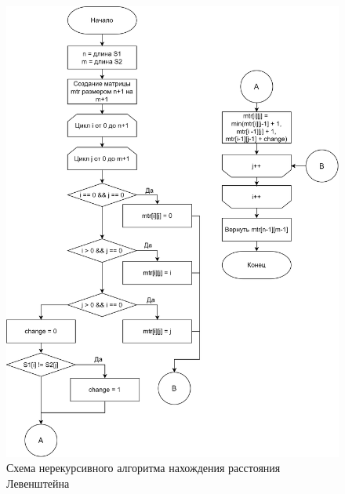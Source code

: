 \begin{figure}[h]
	\centering
	\includegraphics[height=0.8\textheight]{img/levmatr.png}
	\caption{Схема нерекурсивного алгоритма нахождения расстояния Левенштейна}
	\label{fig:Liter}
\end{figure}

\clearpage


